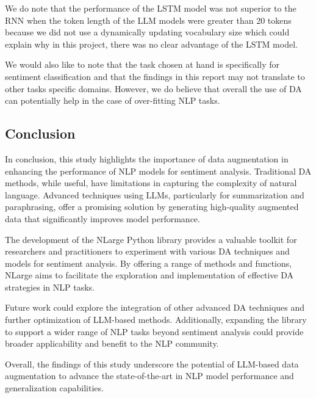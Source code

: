 \documentclass[10pt]{extarticle}
\begin{document}
We do note that the performance of the LSTM model was not superior to the RNN
when the token length of the LLM models were greater than 20 tokens because we
did not use a dynamically updating vocabulary size which could explain why in
this project, there was no clear advantage of the LSTM model.

We would also like to note that the task chosen at hand is specifically for
sentiment classification and that the findings in this report may not translate
to other tasks specific domains. However, we do believe that overall the use of
DA can potentially help in the case of over-fitting NLP tasks.

\subsection{Conclusion}

In conclusion, this study highlights the importance of data augmentation in
enhancing the performance of NLP models for sentiment analysis. Traditional DA
methods, while useful, have limitations in capturing the complexity of natural
language. Advanced techniques using LLMs, particularly for summarization and
paraphrasing, offer a promising solution by generating high-quality augmented
data that significantly improves model performance.

The development of the NLarge Python library provides a valuable toolkit for
researchers and practitioners to experiment with various DA techniques and
models for sentiment analysis. By offering a range of methods and functions,
NLarge aims to facilitate the exploration and implementation of effective DA
strategies in NLP tasks.

Future work could explore the integration of other advanced DA techniques and
further optimization of LLM-based methods. Additionally, expanding the library
to support a wider range of NLP tasks beyond sentiment analysis could provide
broader applicability and benefit to the NLP community.

Overall, the findings of this study underscore the potential of LLM-based data
augmentation to advance the state-of-the-art in NLP model performance and
generalization capabilities.



\end{document}
